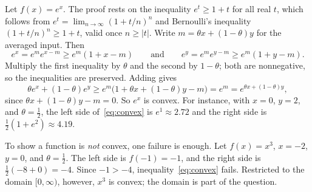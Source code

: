 \begin{example}[Exponential]
  \label{ex:ch01-exp}
  Let $f(x) = e^x$. The proof rests on the inequality $e^t \ge 1 + t$ for
  all real $t$, which follows from $e^t = \lim_{n \to \infty} (1 + t/n)^n$
  and Bernoulli's inequality $(1 + t/n)^n \ge 1 + t$, valid once
  $n \ge |t|$. Write $m = \theta x + (1 - \theta) y$ for the averaged
  input. Then
  \[
    e^x = e^m e^{x - m} \ge e^m (1 + x - m)
    \qquad\text{and}\qquad
    e^y = e^m e^{y - m} \ge e^m (1 + y - m).
  \]
  Multiply the first inequality by $\theta$ and the second by $1 - \theta$;
  both are nonnegative, so the inequalities are preserved. Adding gives
  \[
    \theta e^x + (1 - \theta) e^y
    \ge e^m \bigl(1 + \theta x + (1 - \theta) y - m\bigr)
    = e^m
    = e^{\theta x + (1 - \theta) y},
  \]
  since $\theta x + (1 - \theta) y - m = 0$. So $e^x$ is convex. For
  instance, with $x = 0$, $y = 2$, and $\theta = \tfrac12$, the left side
  of~\eqref{eq:convex} is $e^1 \approx 2.72$ and the right side is
  $\tfrac12(1 + e^2) \approx 4.19$.
\end{example}

\begin{example}
  \label{ex:ch01-cubic}
  To show a function is \emph{not} convex, one failure is enough. Let
  $f(x) = x^3$, $x = -2$, $y = 0$, and $\theta = \tfrac12$. The left side is
  $f(-1) = -1$, and the right side is $\tfrac12(-8 + 0) = -4$. Since
  $-1 > -4$, inequality~\eqref{eq:convex} fails. Restricted to the domain
  $[0, \infty)$, however, $x^3$ is convex; the domain is part of the
  question.
\end{example}


